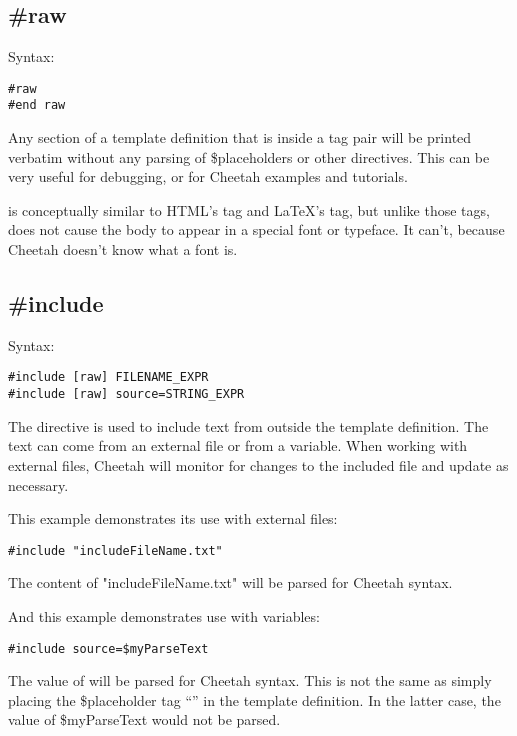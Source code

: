 

\subsection{\#raw}
\label{output.raw}

Syntax:
\begin{verbatim}
#raw
#end raw
\end{verbatim}

Any section of a template definition that is inside a  tag pair will be printed verbatim without any parsing of
\$placeholders or other directives. This can be very useful for debugging, or
for Cheetah examples and tutorials.

 is conceptually similar to HTML's  tag and LaTeX's
\code{\\verbatim\{\}} tag, but unlike those tags,  does not cause
the body to appear in a special font or typeface.  It can't, because Cheetah
doesn't know what a font is.  


\subsection{\#include}
\label{output.include}

Syntax:
\begin{verbatim}
#include [raw] FILENAME_EXPR
#include [raw] source=STRING_EXPR
\end{verbatim}

The  directive is  used to include text from outside the
template definition.  The text can come from an external file or from a
 variable.  When working with external files, Cheetah will
monitor for changes to the included file and update as necessary.  

This example demonstrates its use with external files:
\begin{verbatim}
#include "includeFileName.txt"
\end{verbatim}
The content of "includeFileName.txt" will be parsed for Cheetah syntax.

And this example demonstrates use with  variables:
\begin{verbatim}
#include source=$myParseText
\end{verbatim}
The value of  will be parsed for Cheetah syntax. This is not
the same as simply placing the \$placeholder tag ``'' in
the template definition.  In the latter case, the value of \$myParseText would
not be parsed.

